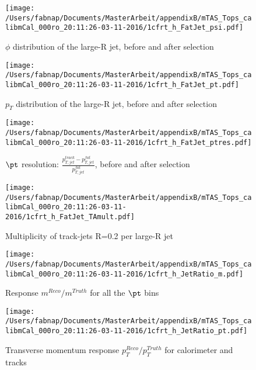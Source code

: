 \begin{figure}
 
\texttt{[image: /Users/fabnap/Documents/MasterArbeit/appendixB/mTAS\_Tops\_calibmCal\_000ro\_20:11:26-03-11-2016/1cfrt\_h\_FatJet\_psi.pdf]}
\caption{$\phi$ distribution of the large-R jet, before and after selection}
 
\end{figure}
 
\begin{figure}
 
\texttt{[image: /Users/fabnap/Documents/MasterArbeit/appendixB/mTAS\_Tops\_calibmCal\_000ro\_20:11:26-03-11-2016/1cfrt\_h\_FatJet\_pt.pdf]}
\caption{$p_{T}$ distribution of the large-R jet, before and after selection}
 
\end{figure}
 
\begin{figure}
 
\texttt{[image: /Users/fabnap/Documents/MasterArbeit/appendixB/mTAS\_Tops\_calibmCal\_000ro\_20:11:26-03-11-2016/1cfrt\_h\_FatJet\_ptres.pdf]}
\caption{$\pt$ resolution: $\frac{p_{T,jet}^{track}-p_{T,jet}^{fat}}{p_{T,jet}^{fat}}$, before and after selection }
 
\end{figure}
 
\begin{figure}
 
\texttt{[image: /Users/fabnap/Documents/MasterArbeit/appendixB/mTAS\_Tops\_calibmCal\_000ro\_20:11:26-03-11-2016/1cfrt\_h\_FatJet\_TAmult.pdf]}
\caption{Multiplicity of track-jets R=0.2 per large-R jet}
 
\end{figure}
\begin{figure}
 
\texttt{[image: /Users/fabnap/Documents/MasterArbeit/appendixB/mTAS\_Tops\_calibmCal\_000ro\_20:11:26-03-11-2016/1cfrt\_h\_JetRatio\_m.pdf]}
\caption{Response $m^{Reco} / m^{Truth}$ for all the $\pt$ bins}
 
\end{figure}
 
\begin{figure}
 
\texttt{[image: /Users/fabnap/Documents/MasterArbeit/appendixB/mTAS\_Tops\_calibmCal\_000ro\_20:11:26-03-11-2016/1cfrt\_h\_JetRatio\_pt.pdf]}
\caption{Transverse momentum response $p_{T}^{Reco} / p_{T}^{Truth}$ for calorimeter and tracks}
 
\end{figure}
 
